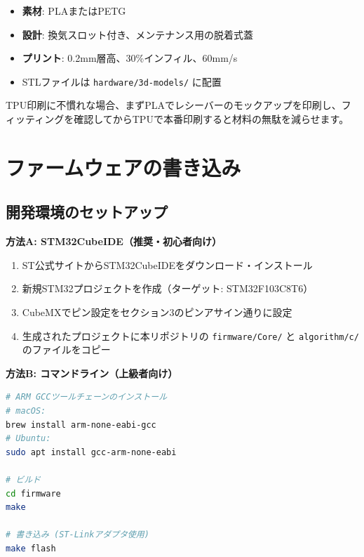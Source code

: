 \documentclass[a4paper,11pt]{article}
\begin{document}
\begin{itemize}[leftmargin=2em]
  \item \textbf{素材}: PLAまたはPETG
  \item \textbf{設計}: 換気スロット付き、メンテナンス用の脱着式蓋
  \item \textbf{プリント}: 0.2mm層高、30\%インフィル、60mm/s
  \item STLファイルは \texttt{hardware/3d-models/} に配置
\end{itemize}

\begin{tipbox}
TPU印刷に不慣れな場合、まずPLAでレシーバーのモックアップを印刷し、フィッティングを確認してからTPUで本番印刷すると材料の無駄を減らせます。
\end{tipbox}

\newpage
\section{ファームウェアの書き込み}

\subsection{開発環境のセットアップ}

\textbf{方法A: STM32CubeIDE（推奨・初心者向け）}

\begin{enumerate}[leftmargin=2em]
  \item ST公式サイトからSTM32CubeIDEをダウンロード・インストール
  \item 新規STM32プロジェクトを作成（ターゲット: STM32F103C8T6）
  \item CubeMXでピン設定をセクション3のピンアサイン通りに設定
  \item 生成されたプロジェクトに本リポジトリの \texttt{firmware/Core/} と \texttt{algorithm/c/} のファイルをコピー
\end{enumerate}

\textbf{方法B: コマンドライン（上級者向け）}

\begin{lstlisting}[language=bash]
# ARM GCCツールチェーンのインストール
# macOS:
brew install arm-none-eabi-gcc
# Ubuntu:
sudo apt install gcc-arm-none-eabi

# ビルド
cd firmware
make

# 書き込み (ST-Linkアダプタ使用)
make flash
\end{lstlisting}
\end{document}
